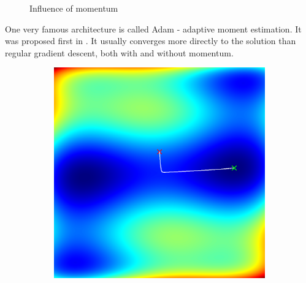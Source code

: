 \documentclass[sigconf,nonacm]{acmart}
\begin{document}
\begin{figure}[ht]
\begin{subfigure}[c]{0.45\columnwidth}
\end{subfigure}
\vspace{-.7\baselineskip}
\caption{Influence of momentum}
\label{p1:momentum}
\end{figure}

One very famous architecture is called Adam - adaptive moment estimation.
It was proposed first in \cite{kingma2014adam}.
It usually converges more directly to the solution than
regular gradient descent, both with and without momentum.

\begin{figure}[ht]
\begin{subfigure}[c]{0.45\columnwidth}
\includegraphics[width=\textwidth]{sgd-camel-nomomentum.png}
\end{subfigure}
\hspace{2pt}
\begin{subfigure}[c]{0.45\columnwidth}

\end{subfigure}
\end{figure}
\end{document}
